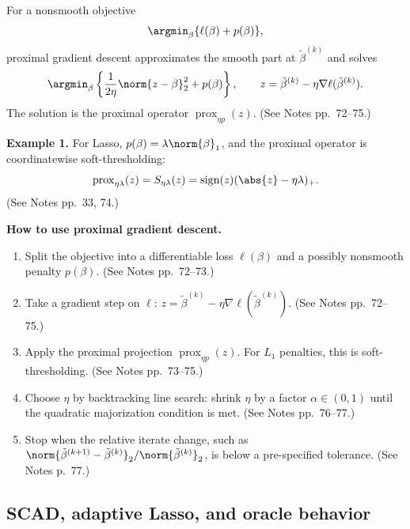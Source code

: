 For a nonsmooth objective
\[
\argmin_\beta\{\ell(\beta)+p(\beta)\},
\]
proximal gradient descent approximates the smooth part at $\tilde\beta^{(k)}$ and solves
\[
\argmin_\beta
\left\{
\frac{1}{2\eta}\norm{z-\beta}_2^2+p(\beta)
\right\},
\qquad
z=\tilde\beta^{(k)}-\eta\nabla\ell(\tilde\beta^{(k)}).
\]
The solution is the proximal operator $\operatorname{prox}_{\eta p}(z)$. (See Notes pp.~72--75.)

\textbf{Example 1.}
For Lasso, $p(\beta)=\lambda\norm{\beta}_1$, and the proximal operator is coordinatewise soft-thresholding:
\[
\operatorname{prox}_{\eta\lambda}(z)
=S_{\eta\lambda}(z)
=\operatorname{sign}(z)(\abs{z}-\eta\lambda)_+.
\]
 (See Notes pp.~33, 74.)

\begin{mybox}
\textbf{How to use proximal gradient descent.}
\begin{enumerate}
    \item Split the objective into a differentiable loss $\ell(\beta)$ and a possibly nonsmooth penalty $p(\beta)$. (See Notes pp.~72--73.)
    \item Take a gradient step on $\ell$: $z=\tilde\beta^{(k)}-\eta\nabla\ell(\tilde\beta^{(k)})$. (See Notes pp.~72--75.)
    \item Apply the proximal projection $\operatorname{prox}_{\eta p}(z)$. For $L_1$ penalties, this is soft-thresholding. (See Notes pp.~73--75.)
    \item Choose $\eta$ by backtracking line search: shrink $\eta$ by a factor $\alpha\in(0,1)$ until the quadratic majorization condition is met. (See Notes pp.~76--77.)
    \item Stop when the relative iterate change, such as $\norm{\tilde\beta^{(k+1)}-\tilde\beta^{(k)}}_2/\norm{\tilde\beta^{(k)}}_2$, is below a pre-specified tolerance. (See Notes p.~77.)
\end{enumerate}
\end{mybox}

\subsection{SCAD, adaptive Lasso, and oracle behavior}
